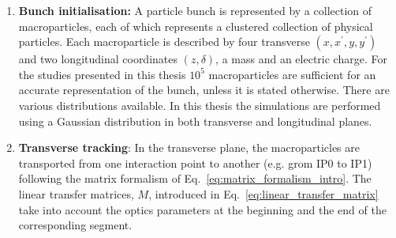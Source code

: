 {\begin{enumerate}
    \item \textbf{Bunch initialisation:}  A particle bunch is represented by a collection of macroparticles, each of which represents a clustered collection of physical particles. Each macroparticle is described by four transverse $(x, x^\prime, y, y^\prime)$ and two longitudinal coordinates $(z, \delta)$, a mass and an electric charge. For the studies presented in this thesis $10^{5}$ macroparticles are sufficient for an accurate representation of the bunch, unless it is stated otherwise. There are various distributions available. In this thesis the simulations are performed using a Gaussian distribution in both transverse and longitudinal planes.
    \item \textbf{Transverse tracking}: In the transverse plane, the macroparticles are transported from one interaction point to another 
    (e.g. grom IP0 to IP1) following the matrix formalism of Eq.~\eqref{eq:matrix_formalism_intro}. The linear transfer matrices, $M$, introduced in Eq.~\eqref{eq:linear_transfer_matrix} take into account the optics parameters at the beginning and the end of the corresponding segment.

\end{enumerate}}
